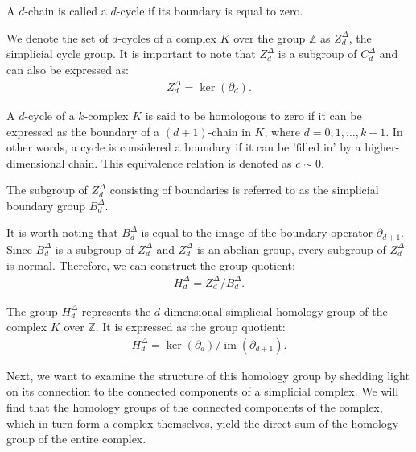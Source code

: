 \begin{definition}[$d$-Cycle]{\cite[p.106]{hatcher2005algebraic}}
	A $d$-chain is called a $d$-cycle if its boundary is equal to zero.
\end{definition}

We denote the set of \( d \)-cycles of a complex \( K \) over the group \( \mathbb{Z} \) as \( Z^{\Delta}_{d} \), the simplicial cycle group. It is important to note that \( Z^{\Delta}_{d} \) is a subgroup of \( C^{\Delta}_{d} \) and can also be expressed as:
\begin{align}
	Z^{\Delta}_{d} = \ker(\partial_{d}). 
\end{align}

A \( d \)-cycle of a \( k \)-complex \( K \) is said to be homologous to zero if it can be expressed as the boundary of a \( (d+1) \)-chain in \( K \), where \( d = 0, 1, \ldots, k-1 \). In other words, a cycle is considered a boundary if it can be 'filled in' by a higher-dimensional chain. This equivalence relation is denoted as \( c \sim 0 \).

\begin{definition}{\cite[\S 2.3]{zomorodian2004computing}}
	The subgroup of $Z^{\Delta}_{d}$ consisting of boundaries is referred to as the simplicial boundary group $B^{\Delta}_{d}$.
\end{definition}

It is worth noting that \( B^{\Delta}_{d} \) is equal to the image of the boundary operator \( \partial_{d+1} \). Since \( B^{\Delta}_{d} \) is a subgroup of \( Z^{\Delta}_{d} \) and \( Z^{\Delta}_{d} \) is an abelian group, every subgroup of \( Z^{\Delta}_{d} \) is normal. Therefore, we can construct the group quotient:
\begin{align}
	H^{\Delta}_{d} = Z^{\Delta}_{d} / B^{\Delta}_{d}. 
\end{align}

\begin{definition}{\cite[\S 2.1]{hatcher2005algebraic}} 
	The group \( H^{\Delta}_{d} \) represents the \( d \)-dimensional simplicial homology group of the complex \( K \) over \( \mathbb{Z} \). It is expressed as the group quotient:
	\begin{align}
		H^{\Delta}_{d} = \ker(\partial_{d}) / \operatorname{im}(\partial_{d+1}). 
	\end{align}
\end{definition}

Next, we want to examine the structure of this homology group by shedding light on its connection to the connected components of a simplicial complex. We will find that the homology groups of the connected components of the complex, which in turn form a complex themselves, yield the direct sum of the homology group of the entire complex.

